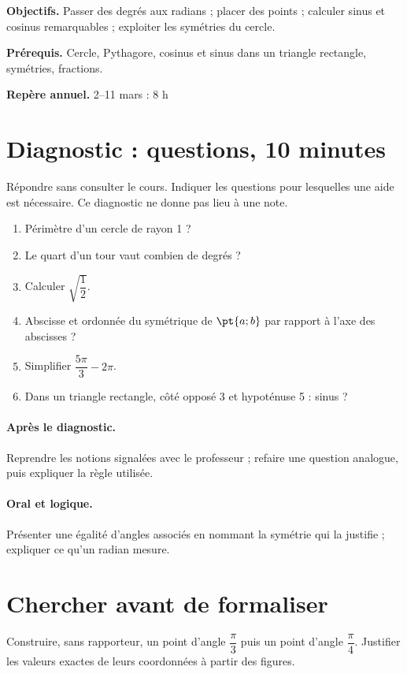 \label{C10}
\begin{keypoint}
\textbf{Objectifs.} Passer des degrés aux radians ; placer des points ; calculer sinus et cosinus remarquables ; exploiter les symétries du cercle.

\textbf{Prérequis.} Cercle, Pythagore, cosinus et sinus dans un triangle rectangle, symétries, fractions.

\textbf{Repère annuel.} 2–11 mars : 8 h\end{keypoint}
\section*{Diagnostic :  questions, 10 minutes}\label{C10-D}
Répondre sans consulter le cours. Indiquer les questions pour lesquelles une aide est nécessaire. Ce diagnostic ne donne pas lieu à une note.
\begin{enumerate}
\item Périmètre d’un cercle de rayon 1 ?
\item Le quart d’un tour vaut combien de degrés ?
\item Calculer $\sqrt {\dfrac{1}{2}}$.
\item Abscisse et ordonnée du symétrique de $\pt{a;b}$ par rapport à l’axe des abscisses ?
\item Simplifier $\dfrac{5\pi}{3}-2\pi $.
\item Dans un triangle rectangle, côté opposé 3 et hypoténuse 5 : sinus ?
\end{enumerate}
\paragraph{Après le diagnostic.} Reprendre les notions signalées avec le professeur ; refaire une question analogue, puis expliquer la règle utilisée.
\paragraph{Oral et logique.} Présenter une égalité d’angles associés en nommant la symétrie qui la justifie ; expliquer ce qu’un radian mesure.
\mxnewpage
\section*{Chercher avant de formaliser}\label{C10-RECH}
Construire, sans rapporteur, un point d’angle $\dfrac{\pi}{3}$ puis un point d’angle $\dfrac{\pi}{4}$. Justifier les valeurs exactes de leurs coordonnées à partir des figures.
